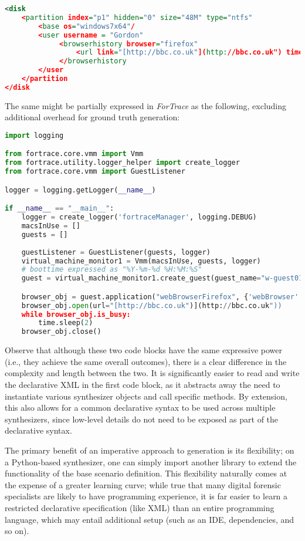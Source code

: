 \documentclass[letterpaper,12pt]{report}
\begin{document}
\begin{lstlisting}[language=XML]
<disk
    <partition index="p1" hidden="0" size="48M" type="ntfs"
        <base os="windows7x64"/
        <user username = "Gordon"
             <browserhistory browser="firefox"
                 <url link="[http://bbc.co.uk"](http://bbc.co.uk") time="13:14:00 1 Jan 2013"/
             </browserhistory
        </user
    </partition
</disk
\end{lstlisting}

The same might be partially expressed in \emph{ForTrace} as the
following, excluding additional overhead for ground truth generation:

\begin{lstlisting}[language=Python]
import logging

from fortrace.core.vmm import Vmm
from fortrace.utility.logger_helper import create_logger
from fortrace.core.vmm import GuestListener

logger = logging.getLogger(__name__)

if __name__ == "__main__":
    logger = create_logger('fortraceManager', logging.DEBUG)
    macsInUse = []
    guests = []
    
    guestListener = GuestListener(guests, logger)
    virtual_machine_monitor1 = Vmm(macsInUse, guests, logger)
    # boottime expressed as "%Y-%m-%d %H:%M:%S"
    guest = virtual_machine_monitor1.create_guest(guest_name="w-guest01", platform="windows", boottime="2013-01-01 13:14:00")

    browser_obj = guest.application("webBrowserFirefox", {'webBrowser': "firefox"})
    browser_obj.open(url="[http://bbc.co.uk")](http://bbc.co.uk"))
    while browser_obj.is_busy:
        time.sleep(2)
    browser_obj.close()
\end{lstlisting}

Observe that although these two code blocks have the same expressive
power (i.e., they achieve the same overall outcomes), there is a clear
difference in the complexity and length between the two. It is
significantly easier to read and write the declarative XML in the first
code block, as it abstracts away the need to instantiate various
synthesizer objects and call specific methods. By extension, this also
allows for a common declarative syntax to be used across multiple
synthesizers, since low-level details do not need to be exposed as part
of the declarative syntax.

The primary benefit of an imperative approach to generation is its
flexibility; on a Python-based synthesizer, one can simply import
another library to extend the functionality of the base scenario
definition. This flexibility naturally comes at the expense of a greater
learning curve; while true that many digital forensic specialists are
likely to have programming experience, it is far easier to learn a
restricted declarative specification (like XML) than an entire
programming language, which may entail additional setup (such as an IDE,
dependencies, and so on).
\end{document}
